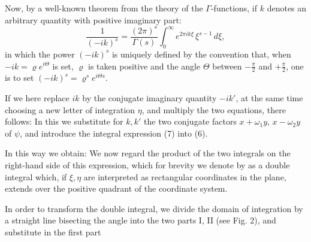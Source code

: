 Now, by a well-known theorem from the theory of the
$\Gamma$-functions, if $k$ denotes an arbitrary quantity with positive
 imaginary part:
\[ \frac{1}{(-ik)^s} = \frac{(2\pi)^s}{\Gamma(s)}\int_0^\infty e^{2\pi ik\xi}\,\xi^{s-1}\,d\xi, \]
in which the power $(-ik)^s$ is uniquely defined by the convention that, when
$-ik = \varrho e^{i\Theta}$ is set, $\varrho$ is taken positive and the angle $\Theta$ between $-\frac{\pi}{2}$
and $+\frac{\pi}{2}$, one is to set $(-ik)^s = \varrho^s e^{i\Theta s}$.

If we here replace $ik$ by the conjugate imaginary
quantity $-ik'$, at the same time choosing a new letter of integration
 $\eta$, and multiply the two equations, there follows:
In this we substitute for $k, k'$ the two conjugate factors
$x+\omega_1y$, $x-\omega_2y$ of $\psi$, and introduce the integral expression (7)
into (6).

In this way we obtain:
We now regard the product of the two integrals on the
right-hand side of this expression, which for brevity we denote by
as a double integral which, if $\xi, \eta$ are interpreted as rectangular
 coordinates in the plane, extends over the positive
quadrant of the coordinate system.


In order to transform the double integral, we divide the domain of integration
 by a straight line bisecting the angle into the two
parts I, II (see Fig. 2), and substitute in the first part
